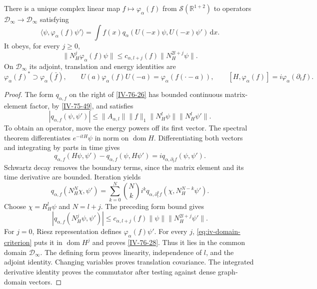 \documentclass[11pt,letterpaper,reqno]{amsart}
\makeatletter
\theoremstyle{definition}
\newcommand{\ms@minorstart}{%
  \pushQED{\qed}\renewcommand{\qedsymbol}{$\blacksquare$}}
\newenvironment{proposition}[1][]{\ms@minorstart\ms@proposition[#1]}
  {\popQED\endms@proposition}
\theoremstyle{remark}
\makeatother
\begin{document}
\begin{proposition}[Smeared fields]\label{IV-76-25}
There is a unique complex linear map
$f\mapsto\varphi_\alpha(f)$ from
$\mathcal S(\mathbb R^{1+2})$ to operators
$\mathcal D_\infty\to\mathcal D_\infty$ satisfying
\begin{equation}\label{IV-76-26}
 \langle\psi,\varphi_\alpha(f)\psi'\rangle
   =\int f(x)q_\alpha(U(-x)\psi,U(-x)\psi')\,\mathrm{d}x.
\end{equation}
It obeys, for every $j\ge0$,
\begin{equation}\label{IV-76-28}
 \|N_H^j\varphi_\alpha(f)\psi\|
             \le c_{\alpha,l+j}(f)\|N_H^{2l+j}\psi\|.
\end{equation}
On $\mathcal D_\infty$ its adjoint, translation and energy
identities are
\begin{equation}\label{IV-76-27}
 \varphi_\alpha(f)^*\supset\varphi_\alpha(\bar f),\qquad
 U(a)\varphi_\alpha(f)U(-a)=\varphi_\alpha(f(\cdot-a)),\qquad
 [H,\varphi_\alpha(f)]=i\varphi_\alpha(\partial_tf).
\end{equation}
\end{proposition}
\begin{proof}
The form $q_{\alpha,f}$ on the right of \eqref{IV-76-26}
has bounded continuous matrix-element factor, by
\eqref{IV-75-49}, and satisfies
\[
 |q_{\alpha,f}(\psi,\psi')|
 \le\|A_{\alpha,l}\|\|f\|_1\|N_H^l\psi\|\|N_H^l\psi'\|.
\]
To obtain an operator, move the energy powers off its first
vector. The spectral theorem differentiates $e^{-itH}\psi$
in norm on $\operatorname{dom}H$. Differentiating both vectors
and integrating by parts in time gives
\[
 q_{\alpha,f}(H\psi,\psi')-q_{\alpha,f}(\psi,H\psi')
                       =i q_{\alpha,\partial_tf}(\psi,\psi').
\]
Schwartz decay removes the boundary terms, since the matrix
element and its time derivative are bounded. Iteration yields
\begin{equation}\label{IV-76-33}
 q_{\alpha,f}(N_H^N\chi,\psi')
       =\sum_{k=0}^N\binom Nk i^k
          q_{\alpha,\partial_t^kf}(\chi,N_H^{N-k}\psi').
\end{equation}
Choose $\chi=R_H^l\psi$ and $N=l+j$. The preceding form bound
gives
\[
 |q_{\alpha,f}(N_H^j\psi,\psi')|
              \le c_{\alpha,l+j}(f)\|\psi\|\|N_H^{2l+j}\psi'\|.
\]
For $j=0$, Riesz representation defines
$\varphi_\alpha(f)\psi'$. For every $j$,
\eqref{eq:iv-domain-criterion} puts it in
$\operatorname{dom}H^j$ and proves \eqref{IV-76-28}.
Thus it lies in the common domain $\mathcal D_\infty$.
The defining form proves linearity, independence of $l$,
and the adjoint identity. Changing variables proves translation
covariance. The integrated derivative identity proves the
commutator after testing against dense graph-domain vectors.
\end{proof}
\end{document}
